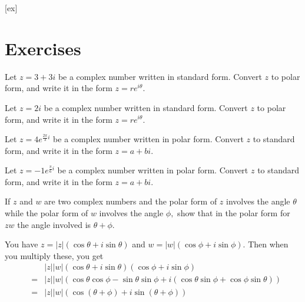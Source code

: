 [ex]
\section*{Exercises}

\begin{enumialphparenastyle}

\begin{ex} Let $z = 3 + 3i$ be a complex number written in standard form. Convert $z$ to polar form, and write it in the form $z = re^{i\theta}$.
\end{ex}

\begin{ex} Let $z = 2i$ be a complex number written in standard form. Convert $z$ to polar form, and write it in the form $z = re^{i\theta}$.
\end{ex}

\begin{ex} Let $z = 4e^{\frac{2\pi}{3}i}$ be a complex number written in polar form. Convert $z$ to standard form, and write it in the form $z = a+bi$.
\end{ex}

\begin{ex} Let $z = -1e^{\frac{\pi}{6}i}$ be a complex number written in polar form. Convert $z$ to standard form, and write it in the form $z = a+bi$.
\end{ex}

\begin{ex} If $z$ and $w$ are two complex numbers and the polar form of $z$
involves the angle $\theta $ while the polar form of $w$ involves the angle 
$\phi ,$ show that in the polar form for $zw$ the angle involved is $\theta
+\phi .$ 
\begin{sol}
 You have $z=\left\vert z\right\vert \left( \cos
\theta +i\sin \theta \right) $ and $w=\left\vert w\right\vert \left( \cos
\phi +i\sin \phi \right) .$ Then when you multiply these, you get
\begin{eqnarray*}
&&\left\vert z\right\vert \left\vert w\right\vert \left( \cos \theta +i\sin
\theta \right) \left( \cos \phi +i\sin \phi \right) \\
&=&\left\vert z\right\vert \left\vert w\right\vert \left( \cos \theta \cos
\phi -\sin \theta \sin \phi +i\left( \cos \theta \sin \phi +\cos \phi \sin
\theta \right) \right) \\
&=&\left\vert z\right\vert \left\vert w\right\vert \left( \cos \left( \theta
+\phi \right) +i\sin \left( \theta +\phi \right) \right)
\end{eqnarray*}
\end{sol}
\end{ex}

\end{enumialphparenastyle}